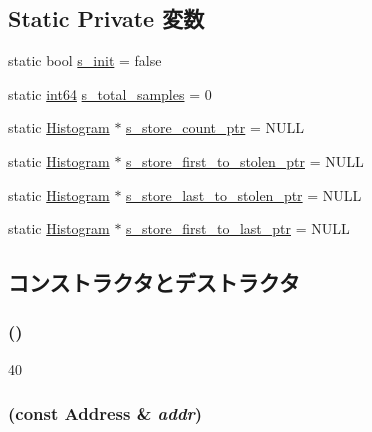 \subsection*{Static Private 変数}
\begin{DoxyCompactItemize}
\item 
static bool \hyperlink{classStoreTrace_a1a064c3d8488d132f5b92f3d63d72f81}{s\_\-init} = false
\item 
static \hyperlink{TypeDefines_8hh_aecfc3c54bd29ad5964e1c1c3ccbf89df}{int64} \hyperlink{classStoreTrace_a60041c8c9991d88b8ca61ac1b84fba14}{s\_\-total\_\-samples} = 0
\item 
static \hyperlink{classHistogram}{Histogram} $\ast$ \hyperlink{classStoreTrace_a8766115fb0cf03bb24a5deee1c98b8be}{s\_\-store\_\-count\_\-ptr} = NULL
\item 
static \hyperlink{classHistogram}{Histogram} $\ast$ \hyperlink{classStoreTrace_a09bc2e6095ee71a5295e2f8f1c83cfe9}{s\_\-store\_\-first\_\-to\_\-stolen\_\-ptr} = NULL
\item 
static \hyperlink{classHistogram}{Histogram} $\ast$ \hyperlink{classStoreTrace_a78467394435ab1294ebf5eca857ab069}{s\_\-store\_\-last\_\-to\_\-stolen\_\-ptr} = NULL
\item 
static \hyperlink{classHistogram}{Histogram} $\ast$ \hyperlink{classStoreTrace_aafabf3594ae23d7e2e3e8ed234d9d006}{s\_\-store\_\-first\_\-to\_\-last\_\-ptr} = NULL
\end{DoxyCompactItemize}


\subsection{コンストラクタとデストラクタ}
\hypertarget{classStoreTrace_a2427e5aea34e3e73f5ea3d160908a04f}{
\subsubsection[{StoreTrace}]{ ()}}
\label{classStoreTrace_a2427e5aea34e3e73f5ea3d160908a04f}



\begin{DoxyCode}
40 { }
\end{DoxyCode}
\hypertarget{classStoreTrace_a3b6cc83de0f940d009afe4e54906dc6f}{
\subsubsection[{StoreTrace}]{ (const {\bf Address} \& {\em addr})}}
\label{classStoreTrace_a3b6cc83de0f940d009afe4e54906dc6f}



